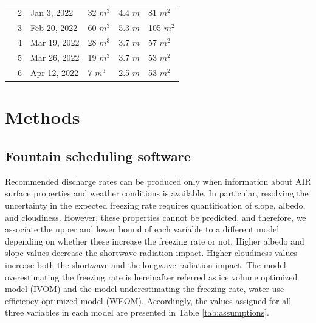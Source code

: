 \documentclass[tc, manuscript]{copernicus}
\begin{document}
\begin{table}
\begin{tabular}{@{}|llllll|@{}}
		\multicolumn{1}{|l|}{} & 2            & Jan 3, 2022   & 32 $m^{3}$      & 4.4 $m$
		                       & 81 $m^{2}$                                                                       \\
		\multicolumn{1}{|l|}{} & 3            & Feb 20, 2022   & 60 $m^{3}$      & 5.3 $m$
		                       & 105 $m^{2}$                                                                       \\
		\multicolumn{1}{|l|}{} & 4            & Mar 19, 2022   & 28 $m^{3}$      & 3.7 $m$
		                       & 57 $m^{2}$                                                                       \\
		\multicolumn{1}{|l|}{} & 5            & Mar 26, 2022   & 19 $m^{3}$      & 3.7 $m$
		                       & 53 $m^{2}$                                                                       \\
		\multicolumn{1}{|l|}{} & 6            & Apr 12, 2022   & 7 $m^{3}$      & 2.5 $m$
		                       & 53 $m^{2}$                                                                       \\
		\bottomrule
	\end{tabular}

\end{table}

\section{Methods}

\subsection{Fountain scheduling software}

Recommended discharge rates can be produced only when information about AIR surface properties and
weather conditions is available. In particular, resolving the uncertainty in the expected freezing rate requires
quantification of slope, albedo, and cloudiness. However, these properties cannot
be predicted, and therefore, we associate the upper and lower bound of each variable to a
different model depending on whether these increase the freezing rate or not. Higher albedo and slope values decrease the shortwave
radiation impact. Higher cloudiness values increase both the shortwave and the longwave radiation impact. The
model overestimating the freezing rate is hereinafter referred as ice volume optimized model (IVOM) and the model
underestimating the freezing rate, water-use efficiency optimized model (WEOM). Accordingly, the values assigned for all three variables in each model are presented in
Table \ref{tab:assumptions}.
\end{document}
